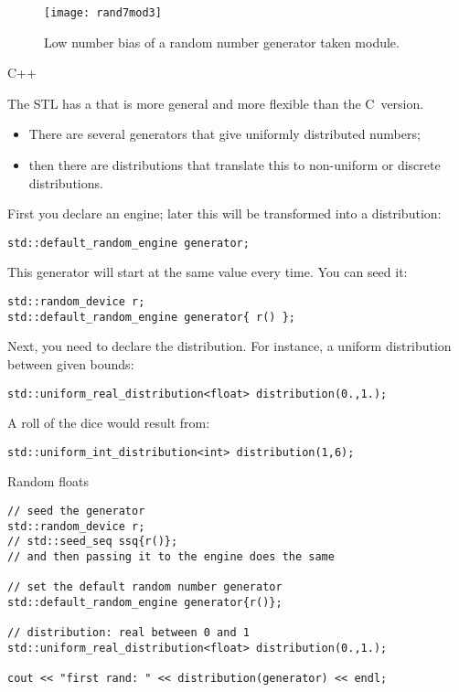 \begin{figure}[t]
  \texttt{[image: rand7mod3]}
  \caption{Low number bias of a random number generator taken module.}
  \label{fig:rand7mod3}
\end{figure}


 {C++}
\lstset{language=C++}

The \ac{STL} has a
that is more general and more flexible than the C~version.
\begin{itemize}
\item There are several generators that give uniformly distributed
  numbers;
\item then there are distributions that translate this to non-uniform
  or discrete distributions.
\end{itemize}

First you declare an engine; later this will be transformed into a distribution:
\begin{lstlisting}
std::default_random_engine generator;
\end{lstlisting}

This generator will start at the same value every time.
You can seed it:
\begin{lstlisting}
std::random_device r;
std::default_random_engine generator{ r() };
\end{lstlisting}

Next, you need to declare the distribution.
For instance, a uniform distribution between given bounds:
\begin{lstlisting}
std::uniform_real_distribution<float> distribution(0.,1.);
\end{lstlisting}
A roll of the dice would result from:
\begin{lstlisting}
std::uniform_int_distribution<int> distribution(1,6);
\end{lstlisting}

 {Random floats}

\begin{lstlisting}
// seed the generator
std::random_device r;
// std::seed_seq ssq{r()};
// and then passing it to the engine does the same

// set the default random number generator
std::default_random_engine generator{r()};

// distribution: real between 0 and 1
std::uniform_real_distribution<float> distribution(0.,1.);

cout << "first rand: " << distribution(generator) << endl;
\end{lstlisting}

